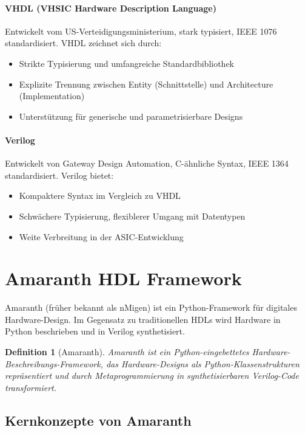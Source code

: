 ﻿\documentclass[12pt,a4paper]{report}
\newtheorem{definition}{Definition}[section]
\begin{document}
\paragraph{VHDL (VHSIC Hardware Description Language)}
Entwickelt vom US-Verteidi\-gungs\-ministerium, stark typisiert, IEEE 1076 standardisiert. VHDL zeichnet sich durch:
\begin{itemize}
    \item Strikte Typisierung und umfangreiche Standardbibliothek
    \item Explizite Trennung zwischen Entity (Schnittstelle) und Architecture (Implementation)
    \item Unterstützung für generische und parametrisierbare Designs
\end{itemize}

\paragraph{Verilog}
Entwickelt von Gateway Design Automation, C-ähnliche Syntax, IEEE 1364 standardisiert. Verilog bietet:
\begin{itemize}
    \item Kompaktere Syntax im Vergleich zu VHDL
    \item Schwächere Typisierung, flexiblerer Umgang mit Datentypen
    \item Weite Verbreitung in der ASIC-Entwicklung
\end{itemize}

\section{Amaranth HDL Framework}

Amaranth (früher bekannt als nMigen) ist ein Python-Framework für digitales Hardware-Design. Im Gegensatz zu traditionellen HDLs wird Hardware in Python beschrieben und in Verilog synthetisiert.

\begin{definition}[Amaranth]
Amaranth ist ein Python-eingebettetes Hardware-Beschrei\-bungs-Framework, das Hardware-Designs als Python-Klassenstrukturen repräsentiert und durch Metaprogrammierung in synthetisierbaren Verilog-Code transformiert.
\end{definition}

\subsection{Kernkonzepte von Amaranth}
\end{document}

